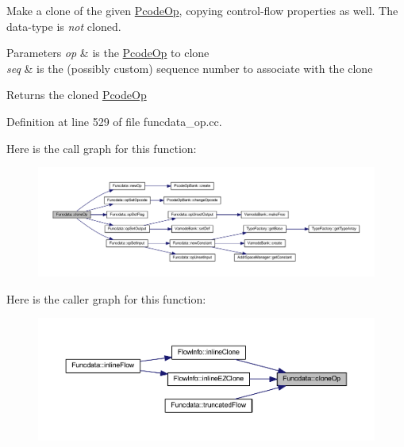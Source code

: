 Make a clone of the given \mbox{\hyperlink{class_pcode_op}{Pcode\+Op}}, copying control-\/flow properties as well. The data-\/type is {\itshape not} cloned. 
\begin{DoxyParams}{Parameters}
{\em op} & is the \mbox{\hyperlink{class_pcode_op}{Pcode\+Op}} to clone \\
\hline
{\em seq} & is the (possibly custom) sequence number to associate with the clone \\
\hline
\end{DoxyParams}
\begin{DoxyReturn}{Returns}
the cloned \mbox{\hyperlink{class_pcode_op}{Pcode\+Op}} 
\end{DoxyReturn}


Definition at line 529 of file funcdata\+\_\+op.\+cc.

Here is the call graph for this function\+:
\nopagebreak
\begin{figure}[H]
\begin{center}
\leavevmode
\includegraphics[width=350pt]{class_funcdata_a1da8e9506c5b37fce86d165974a4cafb_cgraph}
\end{center}
\end{figure}
Here is the caller graph for this function\+:
\nopagebreak
\begin{figure}[H]
\begin{center}
\leavevmode
\includegraphics[width=350pt]{class_funcdata_a1da8e9506c5b37fce86d165974a4cafb_icgraph}
\end{center}
\end{figure}
\mbox{\label{class_funcdata_a4456bfc523a4527c9fd924ecadacec63}} 
